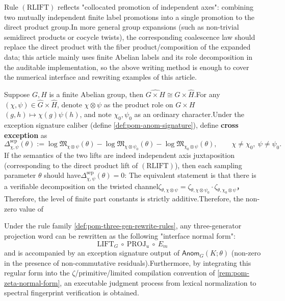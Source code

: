 \begin{remark}\label{rem:pom-rlift-scope}Rule \((\mathrm{RLIFT})\) reflects "collocated promotion of independent axes": combining two mutually independent finite label promotions into a single promotion to the direct product group.In more general group expansions (such as non-trivial semidirect products or cocycle twists), the corresponding coalescence law should replace the direct product with the fiber product/composition of the expanded data; this article mainly uses finite Abelian labels and its role decomposition in the auditable implementation, so the above writing method is enough to cover the numerical interface and rewriting examples of this article.\end{remark}

\begin{remark}\label{rem:pom-rlift-cross-anom-test}Suppose \(G,H\) is a finite Abelian group, then \(\widehat{G\times H}\cong\widehat G\times\widehat H\).For any \((\chi,\psi)\in\widehat G\times\widehat H\), denote \(\chi\otimes\psi\) as the product role on \(G\times H\)\((g,h)\mapsto \chi(g)\psi(h)\), and note \(\chi_0,\psi_0\) as an ordinary character.Under the exception signature caliber (define \ref{def:pom-anom-signature}), define \textbf{cross exception} as\[
\Delta^{\mathrm{sep}}_{\chi,\psi}(\theta)
:=
\log\mathfrak{M}_{\chi\otimes\psi}(\theta)
-\log\mathfrak{M}_{\chi\otimes\psi_0}(\theta)
-\log\mathfrak{M}_{\chi_0\otimes\psi}(\theta),
\qquad
\chi\neq\chi_0,\ \psi\neq\psi_0.
\]
If the semantics of the two lifts are indeed independent axis juxtaposition (corresponding to the direct product lift of \((\mathrm{RLIFT})\)), then each sampling parameter \(\theta\) should have\(\Delta^{\mathrm{sep}}_{\chi,\psi}(\theta)=0\): The equivalent statement is that there is a verifiable decomposition on the twisted channel\(\zeta_{\theta,\chi\otimes\psi}=\zeta_{\theta,\chi\otimes\psi_0}\cdot \zeta_{\theta,\chi_0\otimes\psi}\)，
Therefore, the level of finite part constants is strictly additive.Therefore, the non-zero value of\end{remark}

\begin{proposition}\label{prop:pom-three-gen-interface-normal-form}Under the rule family \ref{def:pom-three-gen-rewrite-rules}, any three-generator projection word can be rewritten as the following "interface normal form":$$
\boxed{\;
\mathrm{LIFT}_G\ \circ\ \mathrm{PROJ}_u\ \circ\ E_m
\;}
$$
and is accompanied by an exception signature output of \(\mathsf{Anom}_G(K;\theta)\) (non-zero in the presence of non-commutative residuals).Furthermore, by integrating this regular form into the \(\zeta\)/primitive/limited compilation convention of \ref{rem:pom-zeta-normal-form}, an executable judgment process from lexical normalization to spectral fingerprint verification is obtained.\end{proposition}

